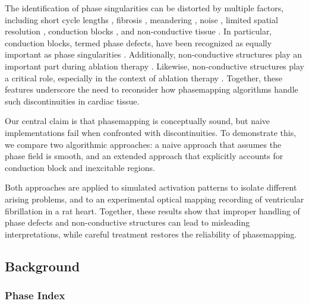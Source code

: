 \documentclass[twocolumn]{article}
\begin{document}
The identification of phase singularities can be distorted by multiple factors,
including short cycle lengths \cite{2018simulation_benchmark_wavelength_fibrosis_roney},
fibrosis \cite{2018simulation_benchmark_wavelength_fibrosis_roney, 2024simulation_benchmark_fibrosis_meandering_noise_lootens},
meandering \cite{2024simulation_benchmark_fibrosis_meandering_noise_lootens},
noise \cite{2024simulation_benchmark_fibrosis_meandering_noise_lootens},
limited spatial resolution \cite{2017clinical_benchmark_resolution_roney},
conduction blocks \cite{2025simulation_benchmark_pm_dgm_hhz_lootens},
and non-conductive tissue \cite{2025simulation_benchmark_pm_dgm_hhz_lootens}.
In particular, conduction blocks, termed phase defects,
have been recognized as equally important as phase singularities \cite{tomii2021spatial, 2021experimental_phasedefect_method_arno}.
Additionally, non-conductive structures play an important part during ablation therapy \cite{duytschaever2024atrial}.
Likewise, non-conductive structures play a critical role,
especially in the context of ablation therapy \cite{duytschaever2024atrial}.
Together, these features underscore the need to reconsider
how phasemapping algorithms handle such discontinuities in cardiac tissue.

Our central claim is that phasemapping is conceptually sound,
but naive implementations fail when confronted with discontinuities.
To demonstrate this, we compare two algorithmic approaches:
a naive approach that assumes the phase field is smooth,
and an extended approach that explicitly accounts for conduction block and inexcitable regions.

Both approaches are applied to simulated activation patterns to isolate different arising problems,
and to an experimental optical mapping recording of ventricular fibrillation in a rat heart.
Together, these results show
that improper handling of phase defects and non-conductive structures
can lead to misleading interpretations,
while careful treatment restores the reliability of phasemapping.

\subsection{Background}

\subsubsection{Phase Index}
\end{document}
